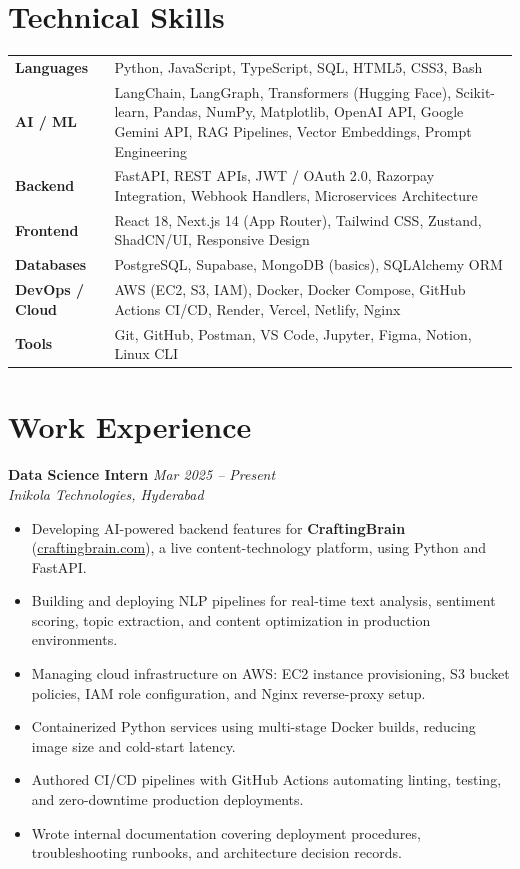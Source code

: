 \documentclass[11pt]{article}
\begin{document}
\section*{Technical Skills}

\begin{tabularx}{\textwidth}{@{}l X@{}}
\textbf{Languages} & Python, JavaScript, TypeScript, SQL, HTML5, CSS3, Bash \\[3pt]
\textbf{AI / ML} & LangChain, LangGraph, Transformers (Hugging Face), Scikit-learn, Pandas, NumPy, Matplotlib, OpenAI API, Google Gemini API, RAG Pipelines, Vector Embeddings, Prompt Engineering \\[3pt]
\textbf{Backend} & FastAPI, REST APIs, JWT / OAuth 2.0, Razorpay Integration, Webhook Handlers, Microservices Architecture \\[3pt]
\textbf{Frontend} & React 18, Next.js 14 (App Router), Tailwind CSS, Zustand, ShadCN/UI, Responsive Design \\[3pt]
\textbf{Databases} & PostgreSQL, Supabase, MongoDB (basics), SQLAlchemy ORM \\[3pt]
\textbf{DevOps / Cloud} & AWS (EC2, S3, IAM), Docker, Docker Compose, GitHub Actions CI/CD, Render, Vercel, Netlify, Nginx \\[3pt]
\textbf{Tools} & Git, GitHub, Postman, VS Code, Jupyter, Figma, Notion, Linux CLI \\
\end{tabularx}

\section*{Work Experience}

\textbf{Data Science Intern} \hfill \textit{Mar 2025 -- Present} \\
\textit{Inikola Technologies, Hyderabad}
\begin{itemize}
\item Developing AI-powered backend features for \textbf{CraftingBrain} (\href{https://craftingbrain.com}{craftingbrain.com}), a live content-technology platform, using Python and FastAPI.
\item Building and deploying NLP pipelines for real-time text analysis, sentiment scoring, topic extraction, and content optimization in production environments.
\item Managing cloud infrastructure on AWS: EC2 instance provisioning, S3 bucket policies, IAM role configuration, and Nginx reverse-proxy setup.
\item Containerized Python services using multi-stage Docker builds, reducing image size and cold-start latency.
\item Authored CI/CD pipelines with GitHub Actions automating linting, testing, and zero-downtime production deployments.
\item Wrote internal documentation covering deployment procedures, troubleshooting runbooks, and architecture decision records.
\end{itemize}
\end{document}
